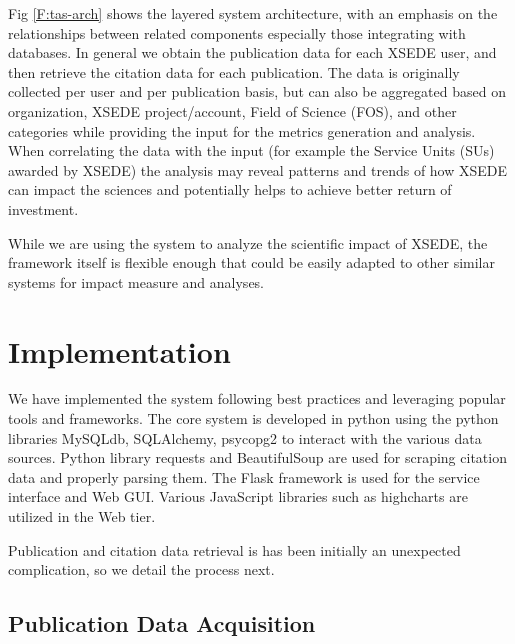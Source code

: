 \documentclass{sig-alternate}
\begin{document}
Fig \ref{F:tas-arch} shows the layered system architecture, with an emphasis on the relationships between related components especially those integrating with databases. In general we obtain the publication data for each XSEDE user, and then retrieve the citation data for each publication. The data is originally collected per user and per publication basis, but can also be aggregated based on organization, XSEDE project/account, Field of Science (FOS), and other categories while providing the input for the metrics generation and analysis. When correlating the data with the input (for example the Service Units (SUs) awarded by XSEDE) the analysis may reveal patterns and trends of how XSEDE can impact the sciences and potentially helps to achieve better return of investment. 
 
While we are using the system to analyze the scientific impact of XSEDE, the framework itself is flexible enough that could be easily adapted to other similar systems for impact measure and analyses. 
 
 
\section{Implementation} \label{S:implementation}
 
We have implemented the system following best practices and leveraging popular tools and frameworks. The core system is developed in python using the  python libraries MySQLdb, SQLAlchemy, psycopg2 to interact with the various data sources. Python library requests and BeautifulSoup are used for scraping citation data and properly parsing them. The Flask framework is used for the service interface and Web GUI. Various JavaScript libraries such as highcharts are utilized in the Web tier. 
 
Publication and citation data retrieval is has been initially an unexpected complication, so we detail the process next. 
 
\subsection{Publication Data Acquisition} 
 
\end{document}

